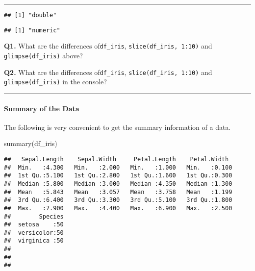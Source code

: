 \documentclass[
]{article}
\newenvironment{Shaded}{\begin{snugshade}}{\end{snugshade}}
\newcommand{\FunctionTok}[1]{\textcolor[rgb]{0.00,0.00,0.00}{#1}}
\newcommand{\NormalTok}[1]{#1}
\newcommand{\SpecialCharTok}[1]{\textcolor[rgb]{0.00,0.00,0.00}{#1}}
\begin{document}
\begin{center}\rule{0.5\linewidth}{0.5pt}\end{center}

\begin{Shaded}
\end{Shaded}

\begin{verbatim}
## [1] "double"
\end{verbatim}

\begin{Shaded}
\end{Shaded}

\begin{verbatim}
## [1] "numeric"
\end{verbatim}

\textbf{Q1.} What are the differences of\texttt{df\_iris},
\texttt{slice(df\_iris,\ 1:10)} and \texttt{glimpse(df\_iris)} above?

\textbf{Q2.} What are the differences of\texttt{df\_iris},
\texttt{slice(df\_iris,\ 1:10)} and \texttt{glimpse(df\_iris)} in the
console?

\begin{center}\rule{0.5\linewidth}{0.5pt}\end{center}

\hypertarget{summary-of-the-data}{%
\paragraph{Summary of the Data}\label{summary-of-the-data}}

The following is very convenient to get the summary information of a
data.

\begin{Shaded}
\begin{Highlighting}[]
\FunctionTok{summary}\NormalTok{(df\_iris)}
\end{Highlighting}
\end{Shaded}

\begin{verbatim}
##   Sepal.Length    Sepal.Width     Petal.Length    Petal.Width   
##  Min.   :4.300   Min.   :2.000   Min.   :1.000   Min.   :0.100  
##  1st Qu.:5.100   1st Qu.:2.800   1st Qu.:1.600   1st Qu.:0.300  
##  Median :5.800   Median :3.000   Median :4.350   Median :1.300  
##  Mean   :5.843   Mean   :3.057   Mean   :3.758   Mean   :1.199  
##  3rd Qu.:6.400   3rd Qu.:3.300   3rd Qu.:5.100   3rd Qu.:1.800  
##  Max.   :7.900   Max.   :4.400   Max.   :6.900   Max.   :2.500  
##        Species  
##  setosa    :50  
##  versicolor:50  
##  virginica :50  
##                 
##                 
## 
\end{verbatim}
\end{document}
